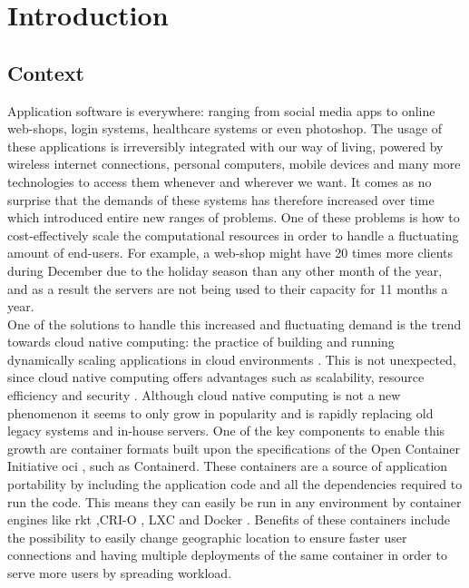 \chapter{Introduction}                                 \label{ch:introduction}




\section{Context}  \label{sec:context}
Application software is everywhere: ranging from social media apps to online web-shops, login systems, healthcare systems or even photoshop. The usage of these applications is irreversibly integrated with our way of living, powered by wireless internet connections, personal computers, mobile devices and many more technologies to access them whenever and wherever we want. It comes as no surprise that the demands of these systems has therefore increased over time which introduced entire new ranges of problems. One of these problems is how to cost-effectively scale the computational resources in order to handle a fluctuating amount of end-users. For example, a web-shop might have 20 times more clients during December due to the holiday season than any other month of the year, and as a result the servers are not being used to their capacity for 11 months a year.
\\[10pt]

 One of the solutions to handle this increased and fluctuating demand is the trend towards cloud native computing: the practice of building and running dynamically scaling applications in cloud environments \cite{CNCF}. This is not unexpected, since cloud native computing offers advantages such as scalability, resource efficiency and security \cite{cnci4}. Although cloud native computing is not a new phenomenon it seems to only grow in popularity \cite{CNCFSurvey} and is rapidly replacing old legacy systems and in-house servers. One of the key components to enable this growth are container formats built upon the specifications of the Open Container Initiative \acrshort{oci} \cite{OCI}, such as Containerd. These containers are a source of application portability by including the application code and all the dependencies required to run the code. This means they can easily be run in any environment by container engines like rkt \cite{rkt},CRI-O \cite{crio}, LXC \cite{LXC} and Docker \cite{Bernstein2014}. Benefits of these containers include the possibility to easily change geographic location to ensure faster user connections and having multiple deployments of the same container in order to serve more users by spreading workload. 
\\[10pt]

